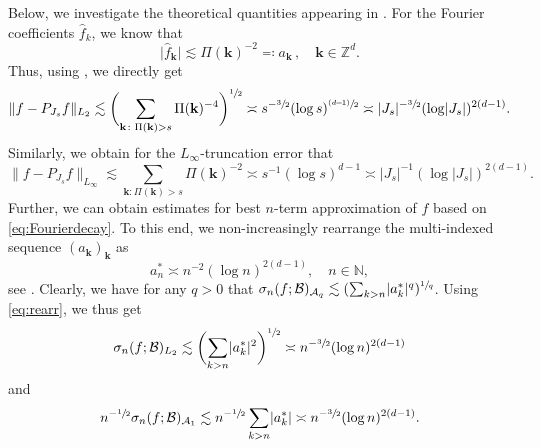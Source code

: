 \documentclass[11pt,reqno, a4paper]{article}
\numberwithin{equation}{section}
\begin{document}
Below, we investigate the theoretical quantities appearing in .
For the Fourier coefficients $\hat{f}_k$, we know that
\begin{equation}\label{eq:Fourierdecay}
    \bigl\lvert\hat{f}_{\mathbf{k}}\bigr\rvert \lesssim \Pi(\mathbf{k})^{-2}\eqqcolon a_{\mathbf{k}}\,,\quad \mathbf{k} \in \mathbb{Z}^d.
\end{equation}
Thus, using \cite[Formula (2.3.2)]{DTU18}, we directly get
\begin{equation}\label{eq:L2_trunc}
    \lVert f-P_{J_s}f\rVert_{L_2} \lesssim \biggl(\sum_{ \mathbf{k}\colon \Pi(\mathbf{k})>s} \Pi(\mathbf{k})^{-4}\biggr)^{\sfrac{1}{2}} \asymp s^{-\sfrac{3}{2}}(\log s)^{\sfrac{(d\!\!-\!\!1)}{2}} \asymp \lvert J_s \rvert^{-\sfrac{3}{2}}(\log \lvert J_s\rvert)^{2(d-1)}.
\end{equation}
Similarly, we obtain for the $L_\infty$-truncation error that
\begin{equation}
\label{eq:L_infty}
    \lVert f-P_{J_s}f\rVert_{L_\infty} \lesssim \sum\limits_{ \mathbf{k}\colon \Pi(\mathbf{k})>s} \Pi(\mathbf{k})^{-2} \asymp s^{-1}(\log s)^{d-1} \asymp \lvert J_s \rvert^{-1}(\log \lvert J_s\rvert)^{2(d-1)}.
\end{equation}
Further, we can obtain estimates for best $n$-term approximation of $f$ based on \eqref{eq:Fourierdecay}.
To this end, we non-increasingly rearrange the multi-indexed sequence $(a_{\mathbf{k}})_{\mathbf{k}}$ as 
\begin{equation}\label{eq:rearr}
    a^*_n \asymp n^{-2}(\log n)^{2(d-1)},\quad n\in \mathbb{N},
\end{equation}
see \cite[Sects.\ 2 and 3]{KSU15}. Clearly, we have for any $q>0$ that $\sigma_n(f;\mathcal{B})_{\mathcal{A}_q} \lesssim (\sum_{k>n} \lvert a^*_k\rvert^q)^{\sfrac{1}{q}}$.
Using \eqref{eq:rearr}, we thus get 
\begin{equation}\label{eq:bestmterm}
    \sigma_n(f;\mathcal{B})_{L_2} \lesssim \biggl(\sum\limits_{k>n} \lvert a^*_k\rvert^2 \biggr)^{\sfrac{1}{2}} \asymp n^{-\sfrac{3}{2}}(\log n)^{2(d-1)}
\end{equation}
and
\begin{equation}\label{eq:bestmterm2}
    n^{-\sfrac{1}{2}}\sigma_n(f;\mathcal{B})_{\mathcal{A}_1}\lesssim n^{-\sfrac{1}{2}} \sum\limits_{k>n} \lvert a^*_k\rvert \asymp n^{-\sfrac{3}{2}}(\log n)^{2(d-1)}.
\end{equation}
\end{document}
